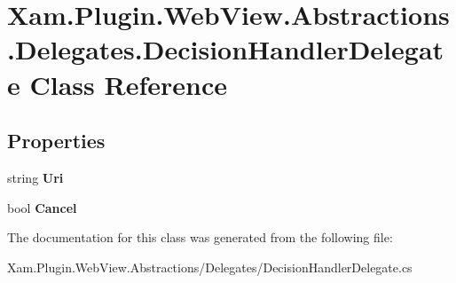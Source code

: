 \hypertarget{class_xam_1_1_plugin_1_1_web_view_1_1_abstractions_1_1_delegates_1_1_decision_handler_delegate}{}\section{Xam.\+Plugin.\+Web\+View.\+Abstractions.\+Delegates.\+Decision\+Handler\+Delegate Class Reference}
\label{class_xam_1_1_plugin_1_1_web_view_1_1_abstractions_1_1_delegates_1_1_decision_handler_delegate}
\subsection*{Properties}
\begin{DoxyCompactItemize}
\item 
\mbox{\label{class_xam_1_1_plugin_1_1_web_view_1_1_abstractions_1_1_delegates_1_1_decision_handler_delegate_a29b47128a0ef46d7436927435498537f}} 
string {\bfseries Uri}
\item 
\mbox{\label{class_xam_1_1_plugin_1_1_web_view_1_1_abstractions_1_1_delegates_1_1_decision_handler_delegate_ad921dc2c84418f07932fe2b266c731eb}} 
bool {\bfseries Cancel}
\end{DoxyCompactItemize}


The documentation for this class was generated from the following file\+:\begin{DoxyCompactItemize}
\item 
Xam.\+Plugin.\+Web\+View.\+Abstractions/\+Delegates/Decision\+Handler\+Delegate.\+cs\end{DoxyCompactItemize}
